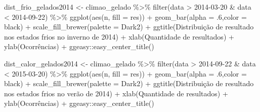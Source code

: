 \documentclass[
]{article}
\newenvironment{Shaded}{\begin{snugshade}}{\end{snugshade}}
\newcommand{\AttributeTok}[1]{\textcolor[rgb]{0.77,0.63,0.00}{#1}}
\newcommand{\DecValTok}[1]{\textcolor[rgb]{0.00,0.00,0.81}{#1}}
\newcommand{\FunctionTok}[1]{\textcolor[rgb]{0.00,0.00,0.00}{#1}}
\newcommand{\NormalTok}[1]{#1}
\newcommand{\OtherTok}[1]{\textcolor[rgb]{0.56,0.35,0.01}{#1}}
\newcommand{\SpecialCharTok}[1]{\textcolor[rgb]{0.00,0.00,0.00}{#1}}
\newcommand{\StringTok}[1]{\textcolor[rgb]{0.31,0.60,0.02}{#1}}
\begin{document}
\begin{Shaded}
\begin{Highlighting}[]
\NormalTok{dist\_frio\_gelados2014 }\OtherTok{\textless{}{-}}\NormalTok{ climao\_gelado }\SpecialCharTok{\%\textgreater{}\%} 
  \FunctionTok{filter}\NormalTok{(data }\SpecialCharTok{\textgreater{}} \StringTok{\textquotesingle{}2014{-}03{-}20\textquotesingle{}} \SpecialCharTok{\&}\NormalTok{ data }\SpecialCharTok{\textless{}} \StringTok{\textquotesingle{}2014{-}09{-}22\textquotesingle{}}\NormalTok{) }\SpecialCharTok{\%\textgreater{}\%}
  \FunctionTok{ggplot}\NormalTok{(}\FunctionTok{aes}\NormalTok{(n, }\AttributeTok{fill =}\NormalTok{ res)) }\SpecialCharTok{+} 
  \FunctionTok{geom\_bar}\NormalTok{(}\AttributeTok{alpha =}\NormalTok{ .}\DecValTok{6}\NormalTok{,}\AttributeTok{color =} \StringTok{\textquotesingle{}black\textquotesingle{}}\NormalTok{) }\SpecialCharTok{+} 
  \FunctionTok{scale\_fill\_brewer}\NormalTok{(}\AttributeTok{palette =} \StringTok{\textquotesingle{}Dark2\textquotesingle{}}\NormalTok{) }\SpecialCharTok{+}
  \FunctionTok{ggtitle}\NormalTok{(}\StringTok{\textquotesingle{}Distribuição de resultado nos estados frios no inverno de 2014\textquotesingle{}}\NormalTok{) }\SpecialCharTok{+}
  \FunctionTok{xlab}\NormalTok{(}\StringTok{\textquotesingle{}Quantidade de resultados\textquotesingle{}}\NormalTok{) }\SpecialCharTok{+} \FunctionTok{ylab}\NormalTok{(}\StringTok{\textquotesingle{}Ocorrências\textquotesingle{}}\NormalTok{) }\SpecialCharTok{+}
\NormalTok{  ggeasy}\SpecialCharTok{::}\FunctionTok{easy\_center\_title}\NormalTok{()}

\NormalTok{dist\_calor\_gelados2014 }\OtherTok{\textless{}{-}}\NormalTok{ climao\_gelado }\SpecialCharTok{\%\textgreater{}\%} 
  \FunctionTok{filter}\NormalTok{(data }\SpecialCharTok{\textgreater{}} \StringTok{\textquotesingle{}2014{-}09{-}22\textquotesingle{}} \SpecialCharTok{\&}\NormalTok{ data }\SpecialCharTok{\textless{}} \StringTok{\textquotesingle{}2015{-}03{-}20\textquotesingle{}}\NormalTok{) }\SpecialCharTok{\%\textgreater{}\%}
  \FunctionTok{ggplot}\NormalTok{(}\FunctionTok{aes}\NormalTok{(n, }\AttributeTok{fill =}\NormalTok{ res)) }\SpecialCharTok{+} 
  \FunctionTok{geom\_bar}\NormalTok{(}\AttributeTok{alpha =}\NormalTok{ .}\DecValTok{6}\NormalTok{,}\AttributeTok{color =} \StringTok{\textquotesingle{}black\textquotesingle{}}\NormalTok{) }\SpecialCharTok{+} 
  \FunctionTok{scale\_fill\_brewer}\NormalTok{(}\AttributeTok{palette =} \StringTok{\textquotesingle{}Dark2\textquotesingle{}}\NormalTok{) }\SpecialCharTok{+}
  \FunctionTok{ggtitle}\NormalTok{(}\StringTok{\textquotesingle{}Distribuição de resultado nos estados frios no verão de 2014\textquotesingle{}}\NormalTok{) }\SpecialCharTok{+}
  \FunctionTok{xlab}\NormalTok{(}\StringTok{\textquotesingle{}Quantidade de resultados\textquotesingle{}}\NormalTok{) }\SpecialCharTok{+} \FunctionTok{ylab}\NormalTok{(}\StringTok{\textquotesingle{}Ocorrências\textquotesingle{}}\NormalTok{) }\SpecialCharTok{+}
\NormalTok{  ggeasy}\SpecialCharTok{::}\FunctionTok{easy\_center\_title}\NormalTok{()}



\end{Highlighting}
\end{Shaded}
\end{document}

